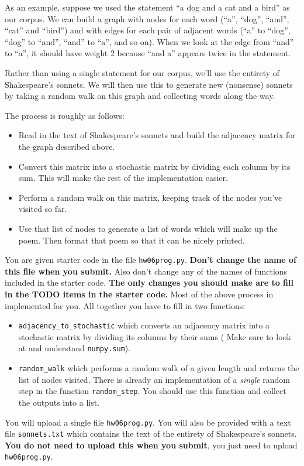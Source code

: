 \documentclass{article}
\theoremstyle{remark}
\begin{document}
As an example, suppose we used the statement ``a dog and a cat and a bird'' as our corpus.
We can build a graph with nodes for each word (``a'', ``dog'', ``and'', ``cat'' and ``bird'') and with edges for each pair of adjacent words (``a'' to ``dog'', ``dog'' to ``and'', ``and'' to ``a'', and so on).
When we look at the edge from ``and'' to ``a'', it should have weight 2 because ``and a'' appears twice in the statement.

Rather than using a single statement for our corpus, we'll use the entirety of Shakespeare's sonnets.
We will then use this to generate new (nonsense) sonnets by taking a random walk on this graph and collecting words along the way.

The process is roughly as follows:
\begin{itemize}
\item Read in the text of Shakespeare's sonnets and build the adjacency matrix for the graph described above.
\item Convert this matrix into a stochastic matrix by dividing each column by its sum.
  This will make the rest of the implementation easier.
\item Perform a random walk on this matrix, keeping track of the nodes you've visited so far.
\item Use that list of nodes to generate a list of words which will make up the poem.
  Then format that poem so that it can be nicely printed.
\end{itemize}

You are given starter code in the file \texttt{hw06prog.py}.
\textbf{Don't change the name of this file when you submit.}
Also don't change any of the names of functions included in the starter code.
\textbf{The only changes you should make are to fill in the TODO items in the starter code.}
Most of the above process in implemented for you.
All together you have to fill in two functions:
\begin{itemize}
\item \texttt{adjacency\_to\_stochastic} which converts an adjacency matrix into a stochastic matrix by dividing its columns by their sums ( Make sure to look at and understand \texttt{numpy.sum}).
\item \texttt{random\_walk} which performs a random walk of a given length and returns the list of nodes visited. There is already an implementation of a \textit{single} random step in the function \texttt{random\_step}. You should use this function and collect the outputs into a list.
\end{itemize}
You will upload a single file \texttt{hw06prog.py}.
You will also be provided with a text file \texttt{sonnets.txt} which contains the text of the entirety of Shakespeare's sonnets.
\textbf{You do not need to upload this when you submit}, you just need to upload \texttt{hw06prog.py}.
\end{document}
